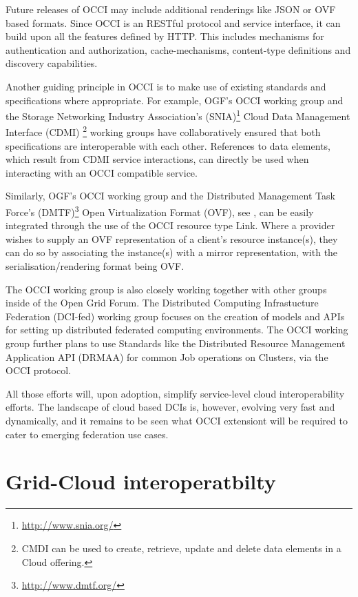 \documentclass[10pt,conference,final,letterpaper,twoside,twocolumn,]{IEEEtran}
\begin{document}
Future releases of OCCI may include additional renderings like JSON or
OVF based formats. Since OCCI is an RESTful protocol and service
interface, it can build upon all the features defined by HTTP. This
includes mechanisms for authentication and authorization,
cache-mechanisms, content-type definitions and discovery capabilities.

Another guiding principle in OCCI is to make use of existing standards
and specifications where appropriate.  For example, OGF's OCCI working
group and the Storage Networking Industry Association's
(SNIA)\footnote{\url{http://www.snia.org/}} Cloud Data Management
Interface (CDMI) \footnote{CMDI can be used to create, retrieve,
update and delete data elements in a Cloud offering.} working groups
have collaboratively ensured that both specifications are
interoperable with each other. References to data elements, which
result from CDMI service interactions, can directly be used when
interacting with an OCCI compatible service.

Similarly, OGF's OCCI working group and the Distributed Management
Task Force's (DMTF)\footnote{\url{http://www.dmtf.org/}} Open
Virtualization Format (OVF), see \cite{CDG+2009}, can be easily
integrated through the use of the OCCI resource type Link. Where a
provider wishes to supply an OVF representation of a client's resource
instance(s), they can do so by associating the instance(s) with a
mirror representation, with the serialisation/rendering format being
OVF.

The OCCI working group is also closely working together with other
groups inside of the Open Grid Forum. The Distributed Computing
Infrastucture Federation (DCI-fed) working group focuses on the
creation of models and APIs for setting up distributed federated
computing environments. The OCCI working group further plans to use
Standards like the Distributed Resource Management Application API
(DRMAA) for common Job operations on Clusters, via the OCCI protocol.

All those efforts will, upon adoption, simplify service-level cloud
interoperability efforts.  The landscape of cloud based DCIs is,
however, evolving very fast and dynamically, and it remains to be seen
what OCCI extensiont will be required to cater to emerging federation
use cases.


\section{Grid-Cloud interoperatbilty}
\label{sec:gcinterop}
\end{document}
